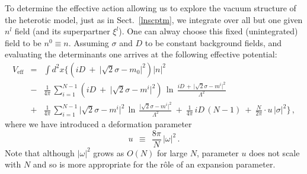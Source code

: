 \documentclass[epsfig,12pt]{article}
\def\beq{\begin{equation}}
\def\eeq{\end{equation}}
\def\beqn{\begin{eqnarray}}
\def\eeqn{\end{eqnarray}}
\def\beqn{\begin{eqnarray}}
\def\eeqn{\end{eqnarray}}
\def\beq{\begin{equation}}
\def\eeq{\end{equation}}
\begin{document}
{To determine the effective action allowing us to explore the vacuum structure of the
heterotic
model, just as in Sect.~\ref{lnscptm}, we integrate over all but one given $ n^l $ field (and its superpartner $ \xi^l $).
One can alway choose this fixed (unintegrated) field to be   $n^0\equiv n$.
Assuming $\sigma$ and $D$ to be constant background fields,
and  evaluating the determinants
one arrives at the following effective potential:
\beqn
	V_\text{eff} & =& \int d^2x 
		\biggl\{  \left( iD ~+~ \bigl|\sqrt{2}\sigma -  m_0 \bigr|^2 \right) |n|^2 
	\nonumber\\[4mm]
	&-& 
	\frac{1}{4\pi}\, \sum_{i=1}^{N-1} \left( iD ~+~ \bigl|\sqrt{2}\sigma -  m^i \bigr|^2 \right)\,
		\ln\, \frac{ iD \,+\, \bigl| \sqrt{2}\sigma - m^i \bigr|^2} {\Lambda^2}
\label{Veff}
\\[4mm]
	&+&
	\frac{1}{4\pi}\, \sum_{i=1}^{N-1} \bigl|\sqrt{2}\sigma - m^i \bigr|^2\,
			\ln\, \frac{ \bigl| \sqrt{2}\sigma - m^i \bigr|^2 } { \Lambda^2 }
	~+~
	\frac{1}{4\pi}\, iD\, (N-1) 
	~+~
	\frac{N}{2\pi} \cdot u\, \bigl|\sigma\bigr|^2 \biggr\} \,,
	\nonumber
\eeqn
where we have introduced a deformation parameter
 \beq
u ~~\equiv~~ \frac{8\pi}{N}\,|\omega|^2 \,.
\label{u}
\eeq	
Note that although $ |\omega|^2 $ grows as $ O(N) $ for large $N$, parameter $u$ 
does not scale with $N$ and so is more appropriate for the r\^{o}le of an expansion parameter. 

}
\end{document}

